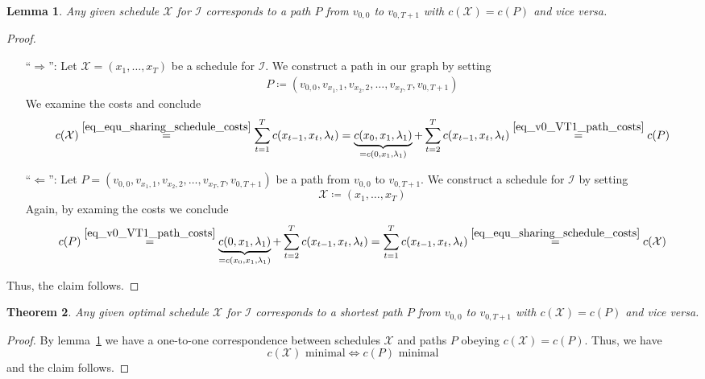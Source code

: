 \documentclass[hidelinks]{article}
\theoremstyle{plain}
\newtheorem{thm}{Theorem}[section]
\newtheorem{lem}[thm]{Lemma}
\theoremstyle{definition}
\theoremstyle{rem}
\newcommand{\mx}{\mathcal{X}}
\newcommand{\inp}{\mathcal{I}}
\newcommand{\costs}{c}
\begin{document}
\begin{lem}\label{lem_opt_sched}
Any given schedule $\mx$ for $\inp$ corresponds to a path $P$ from $v_{0,0}$ to $v_{0,T+1}$ with $\costs(\mx)=\costs(P)$ and vice versa.
\end{lem}
\begin{proof}
$ $
\begin{itemize}
\item[``$\Rightarrow$'':] Let $\mx=(x_1,\ldots,x_T)$ be a schedule for $\inp$. We construct a path in our graph by setting
\begin{align*}
	P\coloneqq(v_{0,0},v_{x_1,1},v_{x_2,2},\ldots,v_{x_T,T},v_{0,T+1})
\end{align*}
We examine the costs and conclude
\begin{equation*}
	\costs(\mx)\stackrel{\eqref{eq_equ_sharing_schedule_costs}}{=}\sum\limits_{t=1}^{T}\costs(x_{t-1},x_{t},\lambda_t)=\underbrace{\costs(x_0,x_1,\lambda_1)}_{=\costs(0,x_1,\lambda_1)}+\sum\limits_{t=2}^{T}\costs(x_{t-1},x_{t},\lambda_t)\stackrel{\eqref{eq_v0_VT1_path_costs}}{=}\costs(P)
\end{equation*}

\item[``$\Leftarrow$'':] Let $P=(v_{0,0},v_{x_1,1},v_{x_2,2},\ldots,v_{x_T,T},v_{0,T+1})$ be a path from $v_{0,0}$ to $v_{0,T+1}$.
We construct a schedule for $\inp$ by setting 
\begin{equation*}
	\mx\coloneqq(x_1,\ldots,x_T)
\end{equation*}
Again, by examing the costs we conclude
\begin{equation*}
	\costs(P)\stackrel{\eqref{eq_v0_VT1_path_costs}}{=}\underbrace{\costs(0,x_1,\lambda_1)}_{=\costs(x_0,x_1,\lambda_1)}+\sum\limits_{t=2}^{T}\costs(x_{t-1},x_{t},\lambda_t)=\sum\limits_{t=1}^{T}\costs(x_{t-1},x_{t},\lambda_t)\stackrel{\eqref{eq_equ_sharing_schedule_costs}}{=}\costs(\mx)
\end{equation*}
\end{itemize}
Thus, the claim follows.
\end{proof}
\begin{thm}
Any given optimal schedule $\mx$ for $\inp$ corresponds to a shortest path $P$ from $v_{0,0}$ to $v_{0,T+1}$ with $\costs(\mx)=\costs(P)$ and vice versa.
\end{thm} 
\begin{proof}
By lemma~\ref{lem_opt_sched} we have a one-to-one correspondence between schedules $\mx$ and paths $P$ obeying $c(\mx)=c(P)$. Thus, we have 
\begin{equation*}
	c(\mx)\text{ minimal}\iff c(P)\text{ minimal}
\end{equation*}
and the claim follows.
\end{proof}
\end{document}
